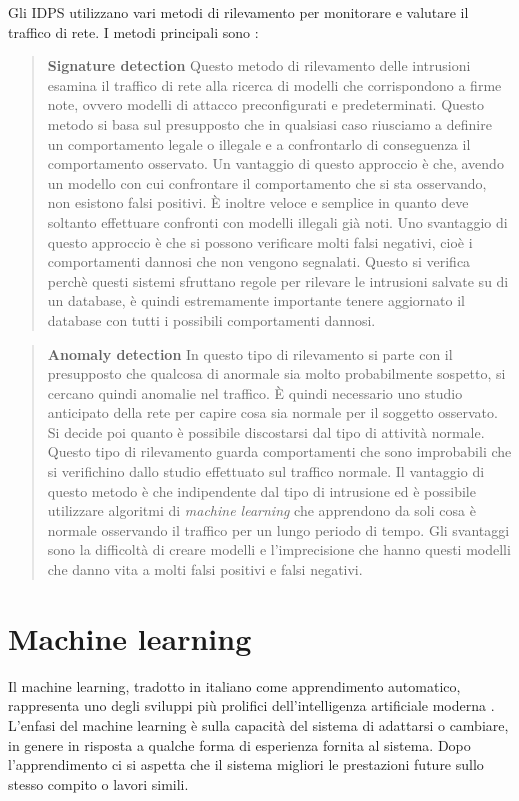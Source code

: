 \documentclass[../main.tex]{subfiles}
\begin{document}
Gli IDPS utilizzano vari metodi di rilevamento per monitorare e valutare il traffico di rete. I metodi principali sono \cite{IDS}:

\begin{verse}
				\textbf{Signature detection} Questo metodo di rilevamento delle intrusioni esamina il traffico di rete alla ricerca di modelli che corrispondono a firme note, ovvero modelli di attacco preconfigurati e predeterminati. Questo metodo si basa sul presupposto che in qualsiasi caso riusciamo a definire un comportamento legale o illegale e a confrontarlo di conseguenza il comportamento osservato.
				Un vantaggio di questo approccio è che, avendo un modello con cui confrontare il comportamento che si sta osservando, non esistono falsi positivi. È inoltre veloce e semplice in quanto deve soltanto effettuare confronti con modelli illegali già noti.
				Uno svantaggio di questo approccio è che si possono verificare molti falsi negativi, cioè i comportamenti dannosi che non vengono segnalati. Questo si verifica perchè questi sistemi sfruttano regole per rilevare le intrusioni salvate su di un database, è quindi estremamente importante tenere aggiornato il database con tutti i possibili comportamenti dannosi.
\end{verse}

\begin{verse}
				\textbf{Anomaly detection} In questo tipo di rilevamento si parte con il presupposto che qualcosa di anormale sia molto probabilmente sospetto, si cercano quindi anomalie nel traffico. È quindi necessario uno studio anticipato della rete per capire cosa sia normale per il soggetto osservato. Si decide poi quanto è possibile discostarsi dal tipo di attività normale. Questo tipo di rilevamento guarda comportamenti che sono improbabili che si verifichino dallo studio effettuato sul traffico normale.  
				Il vantaggio di questo metodo è che indipendente dal tipo di intrusione ed è possibile utilizzare algoritmi di \textit{machine learning} che apprendono da soli cosa è normale osservando il traffico per un lungo periodo di tempo.
				Gli svantaggi sono la difficoltà di creare modelli e l'imprecisione che hanno questi modelli che danno vita a molti falsi positivi e falsi negativi.
\end{verse}

\section{Machine learning}
Il machine learning, tradotto in italiano come apprendimento automatico, rappresenta uno degli sviluppi più prolifici dell'intelligenza artificiale moderna \cite{compIntelligence}. L'enfasi del machine learning è sulla capacità del sistema di adattarsi o cambiare, in genere in risposta a qualche forma di esperienza fornita al sistema. Dopo l'apprendimento ci si aspetta che il sistema migliori le prestazioni future sullo stesso compito o lavori simili. 
\end{document}
